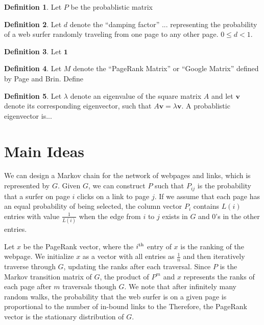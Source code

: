 \documentclass[11pt]{article}
\theoremstyle{definition}
\newtheorem{definition}{Definition}
\renewcommand{\vec}[1]{\mathbf{#1}}
\begin{document}
\begin{definition}
    Let $P$ be the probablistic matrix 
\end{definition}

\begin{definition}
    Let $d$ denote the ``damping factor'' ... representing the probability of a web surfer randomly traveling from one page to any other page. $0 \leq d < 1$.
\end{definition}

\begin{definition}
    Let $\vec{1}$ 
\end{definition}

\begin{definition}
    Let $M$ denote the ``PageRank Matrix'' or ``Google Matrix'' defined by Page and Brin.
    Define 
\end{definition}

\begin{definition}
    Let $\lambda$ denote an eigenvalue of the square matrix $A$ and let $\vec{v}$ denote its corresponding eigenvector, such that $A \vec{v} = \lambda \vec{v}$.
    A probablistic eigenvector is...
\end{definition}

\section{Main Ideas}
We can design a Markov chain for the network of webpages and links, which is represented by $G$.
Given $G$, we can construct $P$ such that $P_{ij}$ is the probability that a surfer on page $i$ clicks on a link to page $j$. 
If we assume that each page has an equal probability of being selected, the column vector $P_i$ contains $L(i)$ entries with value $\frac{1}{L(i)}$ when the edge from $i$ to $j$ exists in $G$ and 0's in the other entries.

Let $x$ be the PageRank vector, where the $i^{\textnormal{th}}$ entry of $x$ is the ranking of the webpage.
We initialize $x$ as a vector with all entries as $\frac{1}{n}$ and then iteratively traverse through $G$, updating the ranks after each traversal.
Since $P$ is the Markov transition matrix of $G$, the product of $P^m$ and $x$ represents the ranks of each page after $m$ traversals though $G$.
We note that after infinitely many random walks, the probability that the web surfer is on a given page is proportional to the number of in-bound links to the 
Therefore, the PageRank vector is the stationary distribution of $G$.
\end{document}
